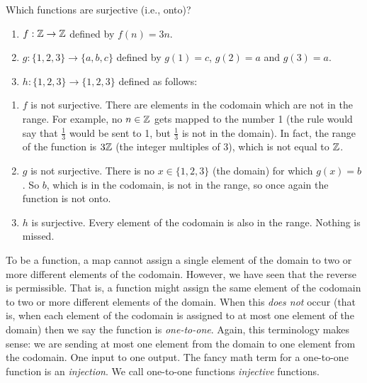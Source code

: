 \documentclass[12pt]{article}
\begin{document}
\begin{example}
  Which functions are surjective (i.e., onto)?
    \begin{enumerate}
    \item $f:\mathbb Z \to \mathbb Z$ defined by $f(n) = 3n$.  
    \item $g: \{1,2,3\} \to \{a,b,c\}$ defined by $g(1) = c$, $g(2) = a$ and $g(3) = a$.  
    \item $h:\{1,2,3\} \to \{1,2,3\}$ defined as follows:
    \begin{center}
    \end{center}
  \end{enumerate}
  \begin{solution}
    \begin{enumerate}
      \item $f$ is not surjective.  There are elements in the codomain which are not in the range.  For example, no $n \in \mathbb Z$ gets mapped to the number 1 (the rule would say that $\frac{1}{3}$ would be sent to 1, but $\frac{1}{3}$ is not in the domain).  In fact, the range of the function is $3\mathbb Z$ (the integer multiples of 3), which is not equal to $\mathbb Z$.
      \item $g$ is not surjective.  There is no $x \in \{1,2,3\}$ (the domain) for which $g(x) = b$.  So $b$, which is in the codomain, is not in the range, so once again the function is not onto.
      \item $h$ is surjective.  Every element of the codomain is also in the range.  Nothing is missed.
    \end{enumerate}

  \end{solution}

\end{example}


To be a function, a map cannot assign a single element of the domain to two or more different elements of the codomain.  However, we have seen that the reverse is permissible.  That is, a function might assign the same element of the codomain to two or more different elements of the domain.  When this \emph{does not} occur (that is, when each element of the codomain is assigned to at most one element of the domain) then we say the function is \emph{one-to-one}.  Again, this terminology makes sense: we are sending at most one element from the domain to one element from the codomain.  One input to one output. The fancy math term for a one-to-one function is an \emph{injection}.  We call one-to-one functions \emph{injective} functions.
\end{document}
